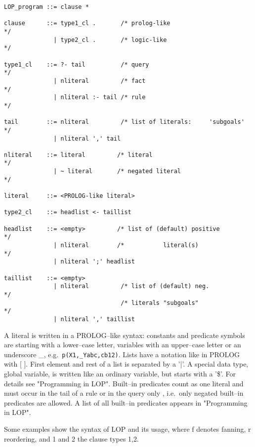 {
\begin{verbatim}
LOP_program ::= clause *

clause      ::= type1_cl .       /* prolog-like                      */
              | type2_cl .       /* logic-like                       */

type1_cl    ::= ?- tail          /* query                            */
              | nliteral         /* fact                             */
              | nliteral :- tail /* rule                             */

tail        ::= nliteral         /* list of literals:     'subgoals' */
              | nliteral ',' tail

nliteral    ::= literal         /* literal                           */
              | ~ literal       /* negated literal                   */

literal     ::= <PROLOG-like literal>

type2_cl    ::= headlist <- taillist

headlist    ::= <empty>         /* list of (default) positive        */
              | nliteral        /*           literal(s)              */
              | nliteral ';' headlist

taillist    ::= <empty>
              | nliteral         /* list of (default) neg.           */
                                 /* literals "subgoals"              */
              | nliteral ',' taillist
\end{verbatim}
}

A literal is written in a PROLOG--like syntax: constants and predicate
symbols are starting with a lower--case letter, variables with an
upper--case letter or an underscore \_, e.g.\ {\tt p(X1,\_Yabc,cb12)}.
Lists have a notation
like in PROLOG with [ ]. First element and rest
of a list is separated by a '|'.
A special data type, global variable, is
written like an ordinary variable, but starts with a '\$'.
For details see "Programming in LOP".
Built--in predicates count as one literal
and must occur in the tail of a rule or in the query only , i.e.\ only negated
built--in predicates are allowed.
A list of all built--in predicates appears in "Programming in LOP".

Some examples show the syntax of LOP and its usage,
where f denotes fanning, r reordering, and 1 and 2 the clause types 1,2.
\vspace{5mm}

